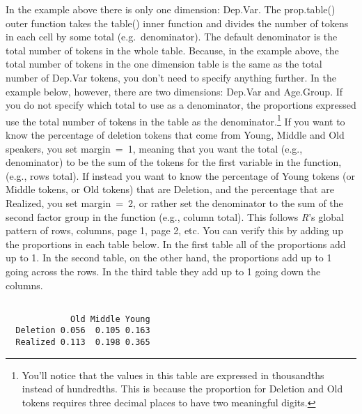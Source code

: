 \documentclass[
  12pt,
  letterpaper]{article}
\newenvironment{Shaded}{\begin{snugshade}}{\end{snugshade}}
\newcommand{\CommentTok}[1]{\textcolor[rgb]{0.37,0.37,0.37}{#1}}
\newcommand{\FunctionTok}[1]{\textcolor[rgb]{0.28,0.35,0.67}{#1}}
\newcommand{\NormalTok}[1]{\textcolor[rgb]{0.00,0.23,0.31}{#1}}
\newcommand{\SpecialCharTok}[1]{\textcolor[rgb]{0.37,0.37,0.37}{#1}}
\renewcommand\texttt[1]{{\ttfamily\color{BrickRed}#1}}
\begin{document}
In the example above there is only one dimension: \texttt{Dep.Var}. The
\texttt{prop.table()} outer function takes the \texttt{table()} inner
function and divides the number of tokens in each cell by some total
(e.g.~denominator). The default denominator is the total number of
tokens in the whole table. Because, in the example above, the total
number of tokens in the one dimension table is the same as the total
number of \texttt{Dep.Var} tokens, you don't need to specify anything
further. In the example below, however, there are two dimensions:
\texttt{Dep.Var} and \texttt{Age.Group}. If you do not specify which
total to use as a denominator, the proportions expressed use the total
number of tokens in the table as the denominator.\footnote{You'll notice
  that the values in this table are expressed in thousandths instead of
  hundredths. This is because the proportion for \texttt{Deletion} and
  \texttt{Old} tokens requires three decimal places to have two
  meaningful digits.} If you want to know the percentage of deletion
tokens that come from \texttt{Young}, \texttt{Middle} and \texttt{Old}
speakers, you set \texttt{margin\ =\ 1}, meaning that you want the total
(e.g., denominator) to be the sum of the tokens for the first variable
in the function, (e.g., rows total). If instead you want to know the
percentage of \texttt{Young} tokens (or \texttt{Middle} tokens, or
\texttt{Old} tokens) that are \texttt{Deletion}, and the percentage that
are \texttt{Realized}, you set \texttt{margin\ =\ 2}, or rather set the
denominator to the sum of the second factor group in the function (e.g.,
column total). This follows \emph{R}'s global pattern of rows, columns,
page 1, page 2, etc. You can verify this by adding up the proportions in
each table below. In the first table all of the proportions add up to 1.
In the second table, on the other hand, the proportions add up to 1
going across the rows. In the third table they add up to 1 going down
the columns.

\begin{Shaded}
\end{Shaded}

\begin{verbatim}
          
             Old Middle Young
  Deletion 0.056  0.105 0.163
  Realized 0.113  0.198 0.365
\end{verbatim}
\end{document}
